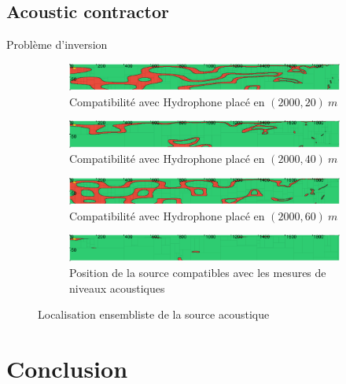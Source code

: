 \documentclass[9pt, xcolor={usenames, dvipsnames}]{beamer}
\begin{document}
			\subsection{Acoustic contractor}


			\begin{frame}{Problème d'inversion}
				\begin{figure}[!htb]
					\begin{subfigure}[!htb]{\textwidth}
						\includegraphics[width=\textwidth]{images/Hydrophone_20_2000.png}
						\caption{Compatibilité avec Hydrophone placé en $(2000, 20)\ m$}
					\end{subfigure}
					\begin{subfigure}[!htb]{\textwidth}
						\includegraphics[width=\textwidth]{images/Hydrophone_40_2000.png}
						\caption{Compatibilité avec Hydrophone placé en $(2000, 40)\ m$}
					\end{subfigure}
					\begin{subfigure}[!htb]{\textwidth}
						\includegraphics[width=\textwidth]{images/Hydrophone_60_2000.png}
						\caption{Compatibilité avec Hydrophone placé en $(2000, 60)\ m$}
					\end{subfigure}
					\begin{subfigure}[!htb]{\textwidth}
						\includegraphics[width=\textwidth]{images/Proteus.png}
						\caption{Position de la source compatibles avec les mesures de niveaux acoustiques}
					\end{subfigure}
					\caption{Localisation ensembliste de la source acoustique}
				\end{figure}
			\end{frame}

		\section{Conclusion}
		
\end{document}
